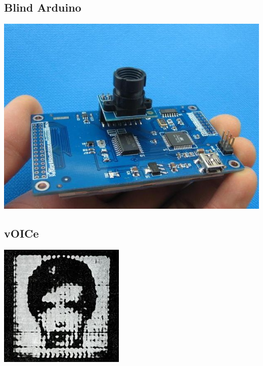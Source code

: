 \documentclass[11pt]{article}
\begin{document}
\subsection*{Blind Arduino}
\label{sec:orgheadline10}
\includegraphics[width=.9\linewidth]{./images/ard.jpg}
\subsection*{vOICe}
\label{sec:orgheadline11}
\includegraphics[width=.9\linewidth]{./images/sense.jpg}
\end{document}
